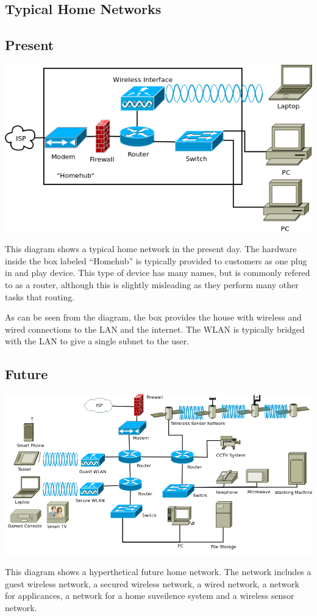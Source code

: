 \documentclass[12pt]{report}
\begin{document}
\begin{landscape}
\appendix 

\chapter{Typical Home Networks}
\section{Present}
\begin{center}
\includegraphics[width=0.75\linewidth]{../Diagrams/Network/TypicalHomenet.png}
\end{center}
This diagram shows a typical home network in the present day. The hardware
inside the box labeled ``Homehub'' is typically provided to customers as one
plug in and play device. This type of device has many names, but is commonly
refered to as a router, although this is slightly misleading as they perform 
many other tasks that routing. 

As can be seen from the diagram, the box provides the house with wireless and
wired connections to the LAN and the internet. The WLAN is typically bridged
with the LAN to give a single subnet to the user. 

\section{Future}
\begin{center}
\includegraphics[width=0.9\linewidth]{../Diagrams/Network/FutureHomenet.png}
\end{center}
This diagram shows a hyperthetical future home network. The network includes a
guest wireless network, a secured wireless network, a wired network, a network
for applicances, a network for a home suveilence system and a wireless sensor
network. 


\end{landscape}
\end{document}

